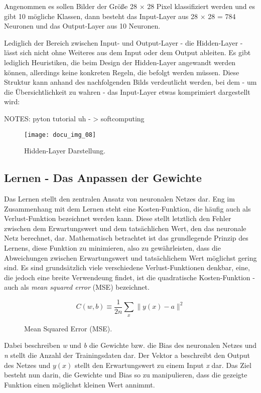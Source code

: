 Angenommen es sollen Bilder der Größe 28 \(\times\) 28 Pixel klassifiziert werden und es gibt 10 mögliche Klassen, dann besteht das Input-Layer aus 28 \(\times\) 28 = 784 Neuronen und das Output-Layer aus 10 Neuronen.

Lediglich der Bereich zwischen Input- und Output-Layer - die Hidden-Layer - lässt sich nicht ohne Weiteres aus dem Input oder dem Output ableiten. Es gibt lediglich Heuristiken, die beim Design der Hidden-Layer angewandt werden können, allerdings keine konkreten Regeln, die befolgt werden müssen. Diese Struktur kann anhand des nachfolgenden Bilds verdeutlicht werden, bei dem - um die Übersichtlichkeit zu wahren - das Input-Layer etwas komprimiert dargestellt wird:

NOTES:
pyton tutorial uh - > softcomputing

\begin{figure}[H]
    \centering
    \texttt{[image: docu\_img\_08]}
    \caption{Hidden-Layer Darstellung.}
    \label{fig:hidden-layers}
\end{figure}

\subsection{Lernen - Das Anpassen der Gewichte}

Das Lernen stellt den zentralen Ansatz von neuronalen Netzes dar. Eng im Zusammenhang mit dem Lernen steht eine
Kosten-Funktion, die häufig auch als Verlust-Funktion bezeichnet werden kann. Diese stellt letztlich den Fehler zwischen
dem Erwartungswert und dem tatsächlichen Wert, den das neuronale Netz berechnet, dar. Mathematisch betrachtet ist das
grundlegende Prinzip des Lernens, diese Funktion zu minimieren, also zu gewährleisten, dass die Abweichungen zwischen
Erwartungswert und tatsächlichem Wert möglichst gering sind. Es sind grundsätzlich viele verschiedene Verlust-Funktionen
denkbar, eine, die jedoch eine breite Verwendeung findet, ist die quadratische Kosten-Funktion - auch als \textit{mean squared
error} (MSE) bezeichnet.

\begin{figure}[H]
    \centering
    \[ C(w, b) \equiv
          \frac{1}{2n}\displaystyle\sum_{x}{\parallel y(x) - a\parallel^2}
    \]
    \caption{Mean Squared Error (MSE).}
    \label{fig:learn-function}
\end{figure}

Dabei beschreiben \textit{w} und \textit{b} die Gewichte bzw. die Bias des neuronalen Netzes und \textit{n} stellt die Anzahl der Trainingsdaten
dar. Der Vektor a beschreibt den Output des Netzes und \textit{\(y(x)\)} stellt den Erwartungswert zu einem Input \textit{x} dar.
Das Ziel besteht nun darin, die Gewichte und Bias so zu manipulieren, dass die gezeigte Funktion einen möglichst kleinen
Wert annimmt.







